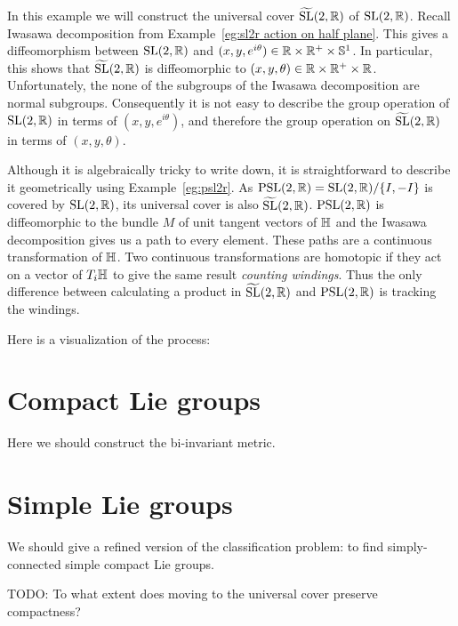\begin{example}
In this example we will construct the universal cover $\widetilde{\mathrm{SL}}(2,\mathbb{R})$ of $\mathrm{SL}(2,\mathbb{R})$.
Recall Iwasawa decomposition from Example~\ref{eg:sl2r action on half plane}.
This gives a diffeomorphism between $\mathrm{SL}(2,\mathbb{R})$ and $(x,y,e^{i\theta}) \in \mathbb{R} \times \mathbb{R}^+ \times \mathbb{S}^1$.
In particular, this shows that $\widetilde{\mathrm{SL}}(2,\mathbb{R})$ is diffeomorphic to $(x,y,\theta) \in \mathbb{R} \times \mathbb{R}^+ \times \mathbb{R}$.
Unfortunately, the none of the subgroups of the Iwasawa decomposition are normal subgroups.
Consequently it is not easy to describe the group operation of $\mathrm{SL}(2,\mathbb{R})$ in terms of $(x,y,e^{i\theta})$, and therefore the group operation on $\widetilde{\mathrm{SL}}(2,\mathbb{R})$ in terms of $(x,y,\theta)$.

Although it is algebraically tricky to write down, it is straightforward to describe it geometrically using Example~\ref{eg:psl2r}.
As $\mathrm{PSL}(2,\mathbb{R}) = \mathrm{SL}(2,\mathbb{R})/\{I,-I\}$ is covered by $\mathrm{SL}(2,\mathbb{R})$, its universal cover is also $\widetilde{\mathrm{SL}}(2,\mathbb{R})$.
$\mathrm{PSL}(2,\mathbb{R})$ is diffeomorphic to the bundle $M$ of unit tangent vectors of $\mathbb{H}$ and the Iwasawa decomposition gives us a path to every element.
These paths are a continuous transformation of $\mathbb{H}$.
Two continuous transformations are homotopic if they act on a vector of $T_i\mathbb{H}$ to give the same result \emph{counting windings}.
Thus the only difference between calculating a product in $\widetilde{\mathrm{SL}}(2,\mathbb{R})$ and $\mathrm{PSL}(2,\mathbb{R})$ is tracking the windings.
\begin{webonly}
Here is a visualization of the process:
\end{webonly}
\end{example}



\section{Compact Lie groups}

Here we should construct the bi-invariant metric.


\section{Simple Lie groups}
We should give a refined version of the classification problem: to find simply-connected simple compact Lie groups.

TODO: To what extent does moving to the universal cover preserve compactness?